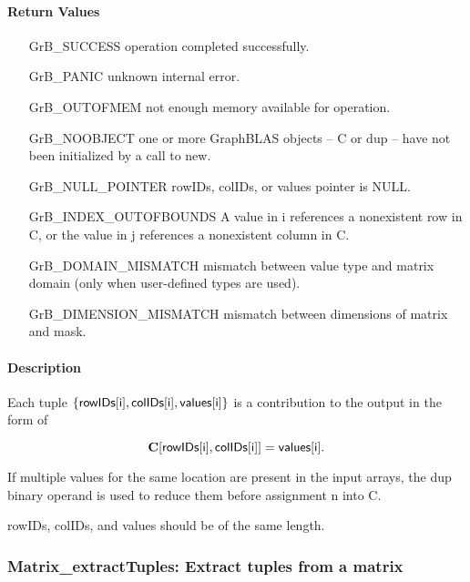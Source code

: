 \paragraph{Return Values}

\begin{itemize}[leftmargin=2.1in]
\item[{\sf GrB\_SUCCESS}]      operation completed successfully.
\item[{\sf GrB\_PANIC}]        unknown internal error.
\item[{\sf GrB\_OUTOFMEM}]     not enough memory available for operation.
\item[{\sf GrB\_NOOBJECT}]     one or more GraphBLAS objects -- {\sf C} or  {\sf dup} -- have not been initialized by a call to {\sf new}.
\item[{\sf GrB\_NULL\_POINTER}]  {\sf rowIDs}, {\sf colIDs}, or {\sf values} pointer is {\sf NULL}.
\item[{\sf GrB\_INDEX\_OUTOFBOUNDS}]
        A value in i references a nonexistent row in C, or
        the value in j references a nonexistent column in C.
\item[\sf GrB\_DOMAIN\_MISMATCH]  
       mismatch between value type and matrix domain (only when user-defined types are used).
\item[\sf GrB\_DIMENSION\_MISMATCH]  
                       mismatch between dimensions of matrix and mask. 
\end{itemize}


\paragraph{Description}
Each tuple $\{ {\sf rowIDs[i]}, {\sf colIDs[i]}, {\sf values[i]}\}$ is a contribution to the output in the form of 

$${\bf C}[{\sf rowIDs[i]}, {\sf colIDs[i]}] = {\sf values[i]}.$$

If multiple values for the same location are present in the input arrays, the 
{\sf dup} binary operand is used to reduce them before assignment n into {\sf C}.
 
{\sf rowIDs}, {\sf colIDs}, and {\sf values} should be of the same length. 


\subsubsection{{\sf Matrix\_extractTuples}: Extract tuples from a matrix}
\label{Sec:Matrix_extractTuples}

